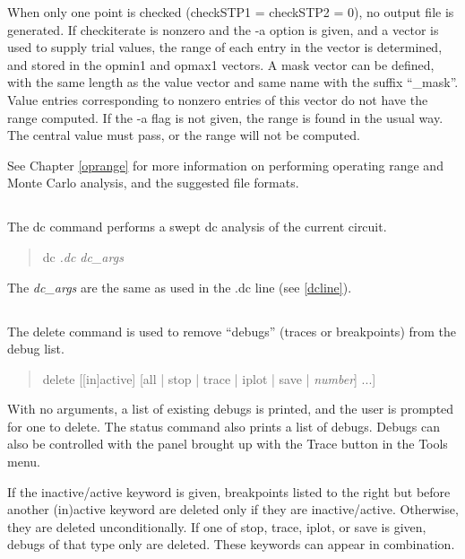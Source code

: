 When only one point is checked ({\vt checkSTP1 = checkSTP2 = 0}), no
output file is generated.  If {\et checkiterate} is nonzero and the
{\vt -a} option is given, and a vector is used to supply trial values,
the range of each entry in the vector is determined, and stored in the
{\et opmin1} and {\et opmax1} vectors.  A mask vector can be defined,
with the same length as the value vector and same name with the suffix
``{\vt \_mask}''.  Value entries corresponding to nonzero entries of
this vector do not have the range computed.  If the {\vt -a} flag is
not given, the range is found in the usual way.  The central value
must pass, or the range will not be computed.

See Chapter \ref{oprange} for more information on performing operating
range and Monte Carlo analysis, and the suggested file formats.

\subsection{}


The {\cb dc} command performs a swept dc analysis of the current
circuit.
\begin{quote}\vt
dc {\it .dc dc\_args}
\end{quote}
The {\it dc\_args} are the same as used in the {\vt .dc} line (see
\ref{dcline}).

\subsection{}


The {\cb delete} command is used to remove ``debugs'' (traces or
breakpoints) from the debug list.
\begin{quote}\vt
delete [[in]active] [all | stop | trace | iplot | save |
 {\it number\/}] ...]
\end{quote}
With no arguments, a list of existing debugs is printed, and the
user is prompted for one to delete.  The {\cb status} command also
prints a list of debugs.  Debugs can also be controlled with the
panel brought up with the {\cb Trace} button in the {\cb Tools}
menu.

If the {\vt inactive}/{\vt active} keyword is given, breakpoints
listed to the right but before another {\vt (in)active} keyword are
deleted only if they are inactive/active.  Otherwise, they are
deleted unconditionally.  If one of {\cb stop}, {\cb trace}, {\cb
iplot}, or {\cb save} is given, debugs of that type only are
deleted.  These keywords can appear in combination.

